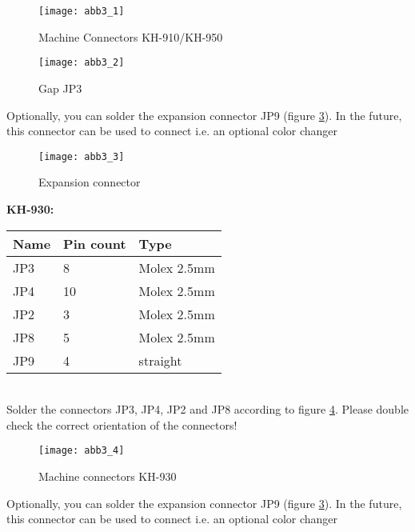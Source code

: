 \documentclass[fleqn,10pt]{SelfArx} %
\begin{document}
\begin{figure}[tbhp]\centering
\texttt{[image: abb3\_1]}
\caption{Machine Connectors KH-910/KH-950}
\label{fig:abb3_1}
\end{figure}

\begin{figure}[tbhp]\centering
\texttt{[image: abb3\_2]}
\caption{Gap JP3}
\label{fig:abb3_2}
\end{figure}

Optionally, you can solder the expansion connector JP9 (figure \ref{fig:abb3_3}). In the future, this connector can be used to connect i.e. an optional color changer \par

\begin{figure}[tbhp]\centering
\texttt{[image: abb3\_3]}
\caption{Expansion connector}
\label{fig:abb3_3}
\end{figure}

\FloatBarrier

\textbf{KH-930:} \\

\begin{tabular}{lll}
\hline
\textbf{Name} & \textbf{Pin count}  & \textbf{Type} \\ \hline
JP3           & 8                 & Molex 2.5mm  \\ \hline
JP4           & 10                & Molex 2.5mm  \\ \hline
JP2           & 3                 & Molex 2.5mm  \\ \hline
JP8           & 5                 & Molex 2.5mm  \\ \hline
JP9           & 4                 & straight     \\ \hline
\end{tabular}\\

Solder the connectors JP3, JP4, JP2 and JP8 according to figure \ref{fig:abb3_4}. Please double check the correct orientation of the connectors!

\begin{figure}[tbhp]\centering
\texttt{[image: abb3\_4]}
\caption{Machine connectors KH-930}
\label{fig:abb3_4}
\end{figure}

Optionally, you can solder the expansion connector JP9 (figure \ref{fig:abb3_3}). In the future, this connector can be used to connect i.e. an optional color changer \par
\end{document}
